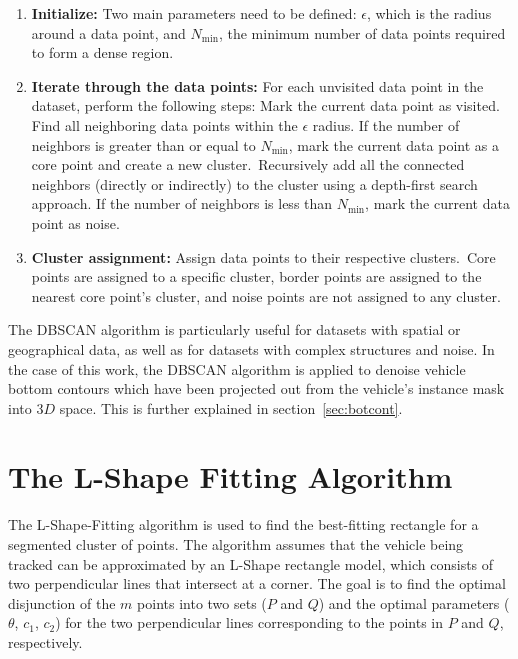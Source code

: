 \begin{enumerate}
    \item \textbf{Initialize:} Two main parameters need to be defined: $\epsilon$, which is the radius around a data point, and $N_\text{min}$, the minimum number of data points required to form a dense region.
    \item \textbf{Iterate through the data points:} For each unvisited data point in the dataset, perform the following steps:
    \subitem Mark the current data point as visited.
    \subitem Find all neighboring data points within the $\epsilon$ radius.
    \subitem If the number of neighbors is greater than or equal to $N_\text{min}$, mark the current data point as a core point and create a new cluster.\ Recursively add all the connected neighbors (directly or indirectly) to the cluster using a depth-first search approach.
    \subitem If the number of neighbors is less than $N_\text{min}$, mark the current data point as noise.
    \item \textbf{Cluster assignment:} Assign data points to their respective clusters.\ Core points are assigned to a specific cluster, border points are assigned to the nearest core point's cluster, and noise points are not assigned to any cluster.
\end{enumerate}

The DBSCAN algorithm is particularly useful for datasets with spatial or geographical data, as well as for datasets with complex structures and noise.
In the case of this work, the DBSCAN algorithm is applied to denoise vehicle bottom contours which have been projected out from the vehicle's instance mask into $3D$ space.
This is further explained in section~\ref{sec:botcont}.


\section{The L-Shape Fitting Algorithm}
\label{sec:lshapefitting}

The L-Shape-Fitting algorithm is used to find the best-fitting rectangle for a segmented cluster of points.
The algorithm assumes that the vehicle being tracked can be approximated by an L-Shape rectangle model, which consists of two perpendicular lines that intersect at a corner.
The goal is to find the optimal disjunction of the $m$ points into two sets ($P$ and $Q$) and the optimal parameters ($\theta$, $c_1$, $c_2$) for the two perpendicular lines corresponding to the points in $P$ and $Q$, respectively.

